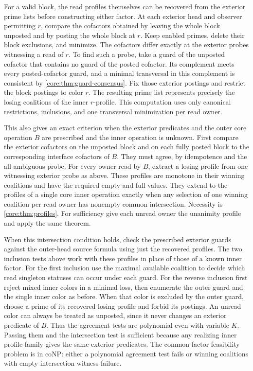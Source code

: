 For a valid block, the read profiles themselves can be recovered
from the exterior prime lists before constructing either factor.
At each exterior head and observer permitting $r$, compare the
cofactors obtained by leaving the whole block unposted and by
posting the whole block at $r$. Keep enabled primes, delete their
block exclusions, and minimize. The cofactors differ exactly at
the exterior probes witnessing a read of $r$. To find such a probe,
take a guard of the unposted cofactor that contains no guard of
the posted cofactor. Its complement meets every posted-cofactor
guard, and a minimal transversal in this complement is consistent
by \cref{core:thm:guard-consensus}. Fix those exterior postings
and restrict the block postings to color $r$. The resulting prime
list represents precisely the losing coalitions of the inner
$r$-profile. This computation uses only canonical restrictions,
inclusions, and one transversal minimization per read owner.

This also gives an exact criterion when the exterior predicates
and the outer core operation $B$ are prescribed and the inner
operation is unknown. First compare the exterior cofactors on the
unposted block and on each fully posted block to the corresponding
interface cofactors of $B$. They must agree, by idempotence and the
all-ambiguous probe. For every owner read by $B$, extract a losing
profile from one witnessing exterior probe as above. These profiles
are monotone in their winning coalitions and have the required empty
and full values. They extend to the profiles of a single core inner
operation exactly when any selection of one winning coalition per
read owner has nonempty common intersection. Necessity is
\cref{core:thm:profiles}. For sufficiency give each unread owner the
unanimity profile and apply the same theorem.

When this intersection condition holds, check the prescribed
exterior guards against the outer-head source formula using just
the recovered profiles. The two inclusion tests above work with
these profiles in place of those of a known inner factor. For the
first inclusion use the maximal available coalition to decide
which read singleton statuses can occur under each guard. For the
reverse inclusion first reject mixed inner colors in a minimal
loss, then enumerate the outer guard and the single inner color as
before. When that color is excluded by the outer guard, choose a
prime of its recovered losing profile and forbid its postings.
An unread color can always be treated as unposted, since it never
changes an exterior predicate of $B$. Thus the agreement tests are
polynomial even with variable $K$. Passing them and the intersection
test is sufficient because any realizing inner profile family gives
the same exterior predicates. The common-factor feasibility problem
is in coNP: either a polynomial agreement test fails or winning
coalitions with empty intersection witness failure.


